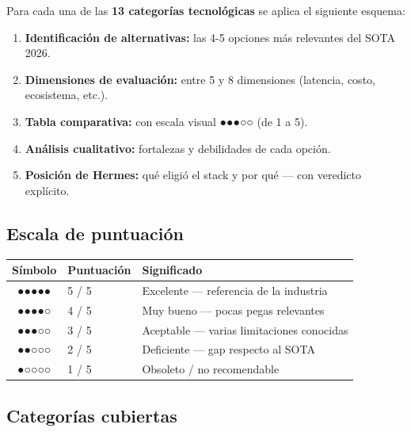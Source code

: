 \documentclass[11pt,a4paper]{article}
\begin{document}
Para cada una de las \textbf{13 categorías tecnológicas} se aplica el siguiente esquema:

\begin{enumerate}[leftmargin=*,itemsep=2pt]
\item \textbf{Identificación de alternativas:} las 4-5 opciones más relevantes del SOTA 2026.
\item \textbf{Dimensiones de evaluación:} entre 5 y 8 dimensiones (latencia, costo, ecosistema, etc.).
\item \textbf{Tabla comparativa:} con escala visual ●●●○○ (de 1 a 5).
\item \textbf{Análisis cualitativo:} fortalezas y debilidades de cada opción.
\item \textbf{Posición de Hermes:} qué eligió el stack y por qué — con veredicto explícito.
\end{enumerate}

\subsection{Escala de puntuación}

\begin{center}
\begin{tabular}{|c|l|l|}
\hline
\rowcolor{sotared}\color{white}\textbf{Símbolo} & \color{white}\textbf{Puntuación} & \color{white}\textbf{Significado}\\
\hline
●●●●● & 5 / 5 & Excelente — referencia de la industria\\
●●●●○ & 4 / 5 & Muy bueno — pocas pegas relevantes\\
●●●○○ & 3 / 5 & Aceptable — varias limitaciones conocidas\\
●●○○○ & 2 / 5 & Deficiente — gap respecto al SOTA\\
●○○○○ & 1 / 5 & Obsoleto / no recomendable\\
\hline
\end{tabular}
\end{center}

\subsection{Categorías cubiertas}
\end{document}
